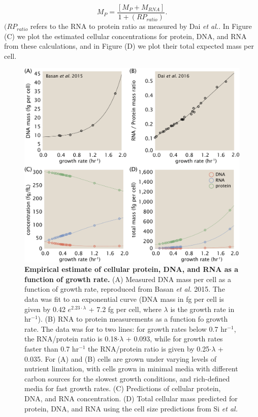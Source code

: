 \begin{equation}
	M_{P} = \frac{[M_P + M_{RNA}]}{1 + (RP_{ratio})}.
\end{equation}
$(RP_{ratio}$ refers to the RNA to protein ratio as measured by Dai \textit{et
al.}. In Figure (C) we plot the
estimated cellular concentrations for protein, DNA, and RNA from these
calculations, and in Figure (D) we plot
their total expected mass per cell.


\begin{figure}
		\centering
    \includegraphics[width=1\textwidth]{SI_figs/schmidt_estimate_protein_RNA_DNA_corrections.pdf}
  \caption{{\bf Empirical estimate of cellular protein, DNA, and RNA as a
  function of growth rate.} (A) Measured DNA mass per cell as a function of
  growth rate, reproduced from Basan \textit{et al.} 2015. The data was fit to
  an exponential curve (DNA mass in fg per cell is given by 0.42 $e^{2.23 \cdot
  \lambda}$ + 7.2 fg per cell, where $\lambda$ is the growth rate in hr$^{-1}$).
  (B) RNA to protein measurements as a function fo growth rate. The data was for
  to two lines: for growth rates below 0.7 hr$^{-1}$, the RNA/protein ratio is
  0.18$\cdot \lambda$ + 0.093, while for growth rates faster than 0.7 hr$^{-1}$
  the RNA/protein ratio is given by 0.25$\cdot \lambda$ + 0.035. For (A) and (B)
  cells are grown under varying levels of nutrient limitation, with cells grown
  in minimal media with different carbon sources for the slowest growth
  conditions, and rich-defined media for fast growth rates. (C) Predictions of
  cellular protein, DNA, and RNA concentration. (D) Total cellular mass
  predicted for protein, DNA, and RNA using the cell size predictions from Si
  \textit{et al.}
	 	}
  \label{fig:schmidt_adjustment_varying_conc}
\end{figure}


